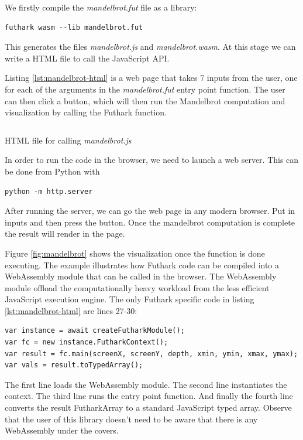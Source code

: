 \documentclass[11pt]{book}
\begin{document}
We firstly compile the \textit{mandelbrot.fut} file as a library:
\begin{verbatim}
futhark wasm --lib mandelbrot.fut
\end{verbatim}
This generates the files \textit{mandelbrot.js} and \textit{mandelbrot.wasm}. At this stage we can write a HTML file to call the JavaScript API.

Listing \ref{lst:mandelbrot-html} is a web page that takes 7 inputs from the user, one for each of the arguments in the \textit{mandelbrot.fut} entry point function. The user can then click a button, which will then run the Mandelbrot computation and visualization by calling the Futhark function.

\begin{listing}[t!] 
        \inputminted[fontsize=\small,baselinestretch=0.5,linenos]{HTML}{code/examples/HTML/mandelbrot.js}
        \caption{HTML file for calling \textit{mandelbrot.js}}
        \label{lst:mandelbrot-html}    
\end{listing}


In order to run the code in the browser, we need to launch a web server. This can be done from Python with
\begin{verbatim}
python -m http.server
\end{verbatim}
After running the server, we can go the web page in any modern browser. Put in inputs and then press the button. Once the mandelbrot computation is complete the result will render in the page.


Figure \ref{fig:mandelbrot} shows the visualization once the function is done executing. The example illustrates how Futhark code can be compiled into a WebAssembly module that can be called in the browser. The WebAssembly module offload the computationally heavy workload from the less efficient JavaScript execution engine. The only Futhark specific code in listing \ref{lst:mandelbrot-html} are lines 27-30:
\begin{verbatim}
var instance = await createFutharkModule();
var fc = new instance.FutharkContext();
var result = fc.main(screenX, screenY, depth, xmin, ymin, xmax, ymax);
var vals = result.toTypedArray();
\end{verbatim}
The first line loads the WebAssembly module. The second line instantiates the context. The third line runs the entry point function. And finally the fourth line converts the result FutharkArray to a standard JavaScript typed array. Observe that the user of this library doesn't need to be aware that there is any WebAssembly under the covers. 
\end{document}
